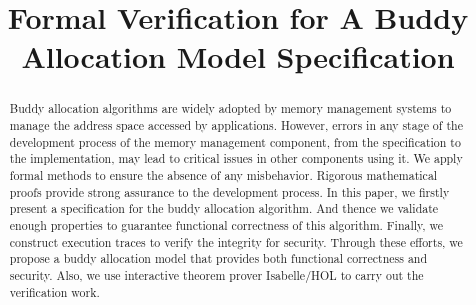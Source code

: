 \documentclass[runningheads]{llncs}
\begin{document}
\title{Formal Verification for A Buddy Allocation Model Specification}

\author{}

\institute{}

\maketitle


\begin{abstract}
Buddy allocation algorithms are widely adopted by memory management systems to manage the address space accessed by applications. However, errors in any stage of the development process of the memory management component, from the specification to the implementation, may lead to critical issues in other components using it. We apply formal methods to ensure the absence of any misbehavior. Rigorous mathematical proofs provide strong assurance to the development process. In this paper, we firstly present a specification for the buddy allocation algorithm. And thence we validate enough properties to guarantee functional correctness of this algorithm. Finally, we construct execution traces to verify the integrity for security. Through these efforts, we propose a buddy allocation model that provides both functional correctness and security. Also, we use interactive theorem prover Isabelle/HOL to carry out the verification work.

\end{abstract}
\end{document}

